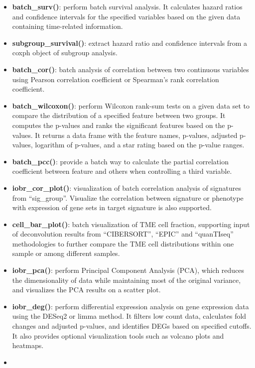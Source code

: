 \documentclass[
  12pt,
]{book}
\providecommand{\tightlist}{%
  \setlength{\itemsep}{0pt}\setlength{\parskip}{0pt}}
\begin{document}
\begin{itemize}
  \begin{itemize}
  \tightlist
  \item
    \textbf{batch\_surv()}: perform batch survival analysis. It calculates hazard ratios and confidence intervals for the specified variables based on the given data containing time-related information.
  \item
    \textbf{subgroup\_survival()}: extract hazard ratio and confidence intervals from a coxph object of subgroup analysis.
  \item
    \textbf{batch\_cor()}: batch analysis of correlation between two continuous variables using Pearson correlation coefficient or Spearman's rank correlation coefficient.
  \item
    \textbf{batch\_wilcoxon()}: perform Wilcoxon rank-sum tests on a given data set to compare the distribution of a specified feature between two groups. It computes the p-values and ranks the significant features based on the p-values. It returns a data frame with the feature names, p-values, adjusted p-values, logarithm of p-values, and a star rating based on the p-value ranges.
  \item
    \textbf{batch\_pcc()}: provide a batch way to calculate the partial correlation coefficient between feature and others when controlling a third variable.
  \item
    \textbf{iobr\_cor\_plot()}: visualization of batch correlation analysis of signatures from ``sig\_group''. Visualize the correlation between signature or phenotype with expression of gene sets in target signature is also supported.
  \item
    \textbf{cell\_bar\_plot()}: batch visualization of TME cell fraction, supporting input of deconvolution results from ``CIBERSORT'', ``EPIC'' and ``quanTIseq'' methodologies to further compare the TME cell distributions within one sample or among different samples.
  \item
    \textbf{iobr\_pca()}: perform Principal Component Analysis (PCA), which reduces the dimensionality of data while maintaining most of the original variance, and visualizes the PCA results on a scatter plot.
  \item
    \textbf{iobr\_deg()}: perform differential expression analysis on gene expression data using the DESeq2 or limma method. It filters low count data, calculates fold changes and adjusted p-values, and identifies DEGs based on specified cutoffs. It also provides optional visualization tools such as volcano plots and heatmaps.
  \item

\end{itemize}
\end{itemize}
\end{document}
